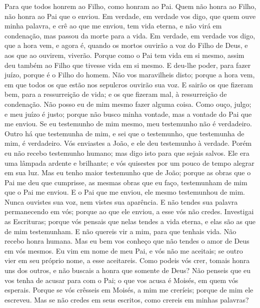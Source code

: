 {  Para que todos honrem ao Filho, como honram ao Pai. Quem não honra ao Filho, não honra ao Pai que o enviou.
  Em verdade, em verdade vos digo, que quem ouve minha palavra, e crê ao que me enviou, tem vida eterna, e não virá em condenação, mas passou da morte para a vida.
  Em verdade, em verdade vos digo, que a hora vem, e agora é, quando os mortos ouvirão a voz do Filho de Deus, e aos que ao ouvirem, viverão.
  Porque como o Pai tem vida em si mesmo, assim deu também ao Filho que tivesse vida em si mesmo.
  E deu-lhe poder, para fazer juízo, porque é o Filho do homem.
  Não vos maravilheis disto; porque a hora vem, em que todos os que estão nos sepulcros ouvirão sua voz.
  E sairão os que fizeram bem, para a ressurreição de vida; e os que fizeram mal, à ressurreição de condenação.
  Não posso eu de mim mesmo fazer alguma coisa. Como ouço,
{} julgo; e meu juízo é justo; porque não busco minha vontade, mas a vontade do Pai que me enviou.
  Se eu testemunho de mim mesmo, meu testemunho não é verdadeiro.
  Outro há que testemunha de mim, e sei que o testemunho, que testemunha de mim, é verdadeiro.
  Vós enviastes
{} a João, e ele deu testemunho à verdade.
  Porém eu não recebo testemunho humano; mas digo isto para que sejais salvos.
  Ele era uma lâmpada ardente e brilhante; e vós quisestes por um pouco de tempo alegrar em sua luz.
  Mas eu tenho maior testemunho que
{} de João; porque as obras que o Pai me deu que cumprisse, as mesmas obras que eu faço, testemunham de mim que o Pai me enviou.
  E o Pai que me enviou, ele mesmo testemunhou de mim. Nunca ouvistes sua voz, nem vistes sua aparência.
  E não tendes sua palavra permanecendo em vós; porque ao que ele enviou, a esse vós não credes.
  Investigai as Escrituras; porque vós pensais que nelas tendes a vida eterna, e elas são as que de mim testemunham.
  E não quereis vir a mim, para que tenhais vida.
  Não recebo honra humana.
  Mas eu bem vos conheço que não tendes o amor de Deus em vós mesmos.
  Eu vim em nome de meu Pai, e vós não me aceitais; se outro vier em seu próprio nome, a esse aceitareis.
  Como podeis vós crer,
{} tomais honra uns dos outros, e não buscais a honra que
{} somente de Deus?
  Não penseis que eu vos tenha de acusar para com o Pai; o que vos acusa é Moisés, em quem vós esperais.
  Porque se vós crêsseis em Moisés,
{} a mim me creríeis; porque de mim ele escreveu.
  Mas se não credes em seus escritos, como crereis em minhas palavras?
\par }

